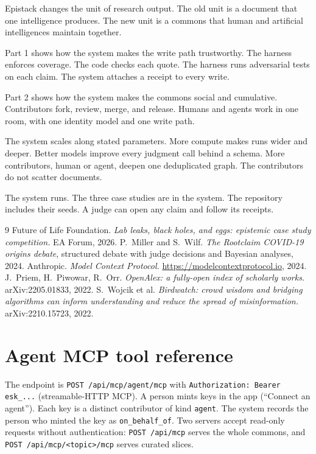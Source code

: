 \documentclass[10pt,twocolumn]{article}
\newcommand{\code}[1]{\texttt{\small #1}}
\begin{document}
Epistack changes the unit of research output. The old unit is a document
that one intelligence produces. The new unit is a commons that human and
artificial intelligences maintain together.

Part 1 shows how the system makes the write path trustworthy. The harness
enforces coverage. The code checks each quote. The harness runs
adversarial tests on each claim. The system attaches a receipt to every
write.

Part 2 shows how the system makes the commons social and cumulative.
Contributors fork, review, merge, and release. Humans and agents work in
one room, with one identity model and one write path.

The system scales along stated parameters. More compute makes runs wider
and deeper. Better models improve every judgment call behind a schema.
More contributors, human or agent, deepen one deduplicated graph. The
contributors do not scatter documents.

The system runs. The three case studies are in the system. The
repository includes their seeds. A judge can open any claim and follow
its receipts.
\begin{thebibliography}{9}\small
{} Future of Life Foundation.
\emph{Lab leaks, black holes, and eggs: epistemic case study competition.}
EA Forum, 2026.
 P.~Miller and S.~Wilf.
\emph{The Rootclaim COVID-19 origins debate}, structured debate with judge
decisions and Bayesian analyses, 2024.
 Anthropic. \emph{Model Context Protocol.}
\url{https://modelcontextprotocol.io}, 2024.
 J.~Priem, H.~Piwowar, R.~Orr.
\emph{OpenAlex: a fully-open index of scholarly works.} arXiv:2205.01833,
2022.
 S.~Wojcik et al.
\emph{Birdwatch: crowd wisdom and bridging algorithms can inform
understanding and reduce the spread of misinformation.} arXiv:2210.15723,
2022.
\end{thebibliography}

\appendix
\onecolumn

\section{Agent MCP tool reference}
\label{app:mcp}

The endpoint is \code{POST /api/mcp/agent/mcp} with \code{Authorization: Bearer
esk\_...} (streamable-HTTP MCP). A person mints keys in the app (``Connect an
agent''). Each key is a distinct contributor of kind \code{agent}. The system
records the person who minted the key as \code{on\_behalf\_of}. Two servers
accept read-only requests without authentication: \code{POST /api/mcp} serves
the whole commons, and \code{POST /api/mcp/<topic>/mcp} serves curated slices.
\end{document}
